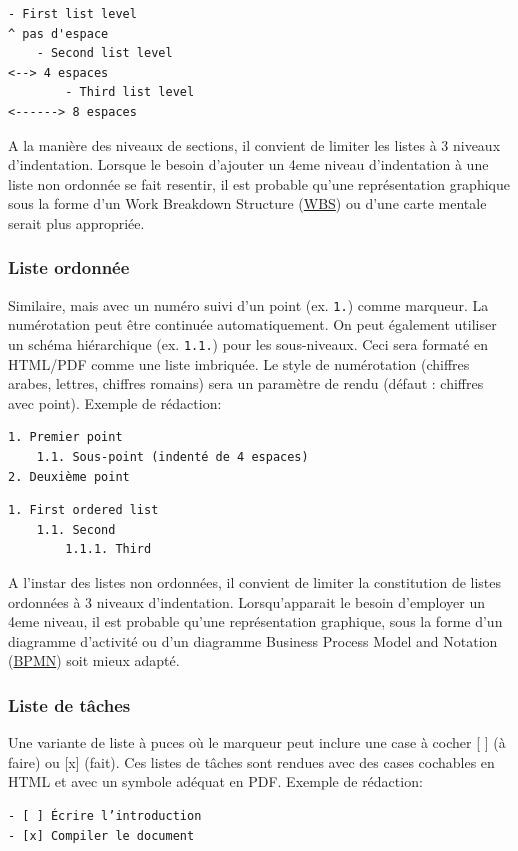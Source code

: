 \documentclass[a4paper,12pt]{article}
\begin{document}
\begin{verbatim}
- First list level
^ pas d'espace
    - Second list level
<--> 4 espaces
        - Third list level
<------> 8 espaces
\end{verbatim}

A la manière des niveaux de sections, il convient de limiter les listes à 3 niveaux d'indentation. Lorsque le besoin d'ajouter un 4eme niveau d'indentation à une liste non ordonnée se fait resentir, il est probable qu'une représentation graphique sous la forme d'un Work Breakdown Structure
 (\protect\hyperlink{gls-7}{\label{gls-7-use-1}WBS}) ou d'une carte mentale serait plus appropriée.
\subsubsection{Liste ordonnée}
\label{sec:org2acd3a9}
Similaire, mais avec un numéro suivi d’un point (ex. \texttt{1.}) comme marqueur. La numérotation peut être continuée automatiquement. On peut également utiliser un schéma hiérarchique (ex. \texttt{1.1.}) pour les sous-niveaux. Ceci sera formaté en HTML/PDF comme une liste imbriquée. Le style de numérotation (chiffres arabes, lettres, chiffres romains) sera un paramètre de rendu (défaut : chiffres avec point). Exemple de rédaction:
\begin{verbatim}
1. Premier point
    1.1. Sous-point (indenté de 4 espaces)
2. Deuxième point
\end{verbatim}

\begin{verbatim}
1. First ordered list
    1.1. Second
        1.1.1. Third
\end{verbatim}

A l'instar des listes non ordonnées, il convient de limiter la constitution de listes ordonnées à 3 niveaux d'indentation. Lorsqu'apparait le besoin d'employer un 4eme niveau, il est probable qu'une représentation graphique, sous la forme d'un diagramme d'activité ou d'un diagramme Business Process Model and Notation
 (\protect\hyperlink{gls-8}{\label{gls-8-use-1}BPMN}) soit mieux adapté.
\subsubsection{Liste de tâches}
\label{sec:orgad0a73f}
Une variante de liste à puces où le marqueur peut inclure une case à cocher [ ] (à faire) ou [x] (fait). Ces listes de tâches sont rendues avec des cases cochables en HTML et avec un symbole adéquat en PDF. Exemple de rédaction:
\begin{verbatim}
- [ ] Écrire l’introduction
- [x] Compiler le document
\end{verbatim}
\end{document}
